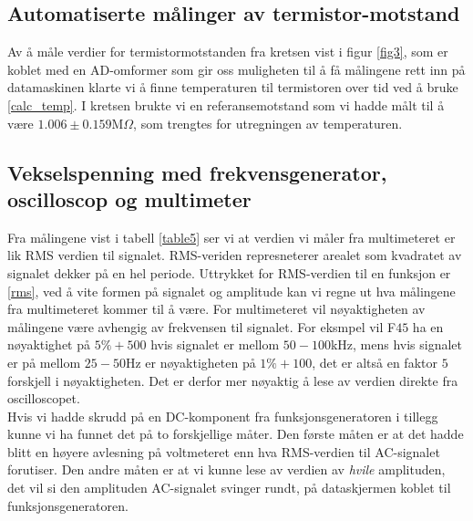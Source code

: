 \documentclass[%
 reprint,
 amsmath,amssymb,
 aps,
]{revtex4-1}
\begin{document}
\subsection{Automatiserte målinger av termistor-motstand}
Av å måle verdier for termistormotstanden fra kretsen vist i figur \vref{fig3}, som er koblet med en AD-omformer som gir oss muligheten til å få målingene rett inn på datamaskinen klarte vi å finne temperaturen til termistoren over tid ved å bruke \eqref{calc_temp}. I kretsen brukte vi en referansemotstand som vi hadde målt til å være $1.006 \pm 0.159$M$\Omega$, som trengtes for utregningen av temperaturen.
\subsection{Vekselspenning med frekvensgenerator, oscilloscop og multimeter}
Fra målingene vist i tabell \ref{table5} ser vi at verdien vi måler fra multimeteret er lik RMS verdien til signalet. RMS-veriden represneterer arealet som kvadratet av signalet dekker på en hel periode. Uttrykket for RMS-verdien til en funksjon er \eqref{rms}, ved å vite formen på signalet og amplitude kan vi regne ut hva målingene fra multimeteret kommer til å være. For multimeteret vil nøyaktigheten av målingene være avhengig av frekvensen til signalet. For eksmpel vil F$45$ ha en nøyaktighet på $5\% + 500$ hvis signalet er mellom $50-100$kHz, mens hvis signalet er på mellom $25-50$Hz er nøyaktigheten på $1\%+100$, det er altså en faktor $5$ forskjell i nøyaktigheten. Det er derfor mer nøyaktig å lese av verdien direkte fra oscilloscopet. \\
Hvis vi hadde skrudd på en DC-komponent fra funksjonsgeneratoren i tillegg kunne vi ha funnet det på to forskjellige måter. Den første måten er at det hadde blitt en høyere avlesning på voltmeteret enn hva RMS-verdien til AC-signalet forutiser. Den andre måten er at vi kunne lese av verdien av \textit{hvile} amplituden, det vil si den amplituden AC-signalet svinger rundt, på dataskjermen koblet til funksjonsgeneratoren.
\end{document}
